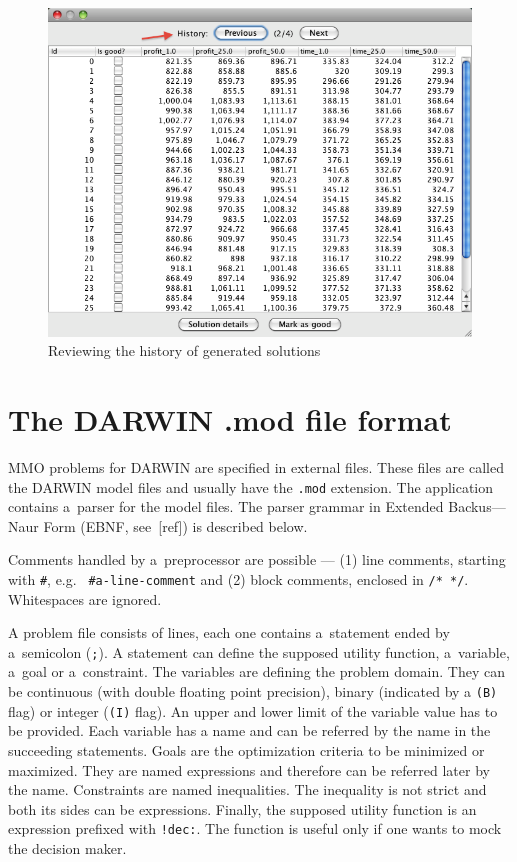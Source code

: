 \begin{figure}
  \centering
  \includegraphics[scale=0.7]{img/manual/10_history}
  \caption{Reviewing the history of generated solutions}
  \label{manual_10_history}
\end{figure}

\clearpage{}
\section*{The DARWIN .mod file format}

MMO problems for DARWIN are specified in external files. These files are called the
DARWIN model files and usually have the \texttt{.mod} extension. The
application contains a~parser for the model files. The parser grammar in
Extended Backus---Naur Form (EBNF, see~[ref]) is described below.



Comments handled by a~preprocessor are possible --- (1) line comments,
starting with \texttt{\#}, e.g. \texttt{ \#a-line-comment} and (2) block
comments, enclosed in \texttt{/* */}. Whitespaces are ignored.

A problem file consists of lines, each one contains a~statement ended by
a~semicolon (\texttt{;}). A statement can define the supposed utility
function, a~variable, a~goal or a~constraint. The variables are defining the
problem domain. They can be continuous (with double floating point precision),
binary (indicated by a \texttt{(B)} flag) or integer (\texttt{(I)} flag). An
upper and lower limit of the variable value has to be provided. Each variable
has a name and can be referred by the name in the succeeding statements. Goals
are the optimization criteria to be minimized or maximized. They are named
expressions and therefore can be referred later by the name. Constraints are
named inequalities. The inequality is not strict and both its sides can be
expressions. Finally, the supposed utility function is an expression prefixed
with \texttt{!dec:}. The function is useful only if one wants to mock the
decision maker.

